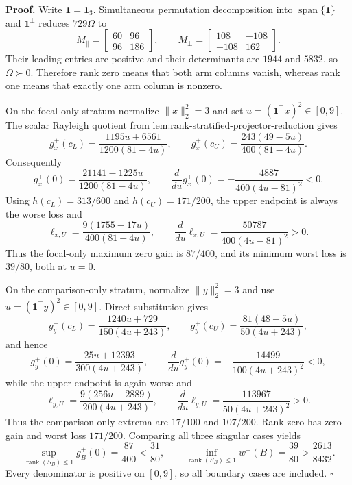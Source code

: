 \textbf{Proof.}
Write \(\mathbf1=\mathbf1_3\).  Simultaneous permutation decomposition into \(\operatorname{span}\{\mathbf1\}\) and \(\mathbf1^\perp\) reduces \(729\Omega\) to
\[
M_\parallel=\begin{bmatrix}60&96\\96&186\end{bmatrix},
\qquad M_\perp=\begin{bmatrix}108&-108\\-108&162\end{bmatrix}.
\]
Their leading entries are positive and their determinants are \(1944\) and \(5832\), so \(\Omega\succ0\).  Therefore rank zero means that both arm columns vanish, whereas rank one means that exactly one arm column is nonzero.

On the focal-only stratum normalize \(\lVert x\rVert_2^2=3\) and set \(u=(\mathbf1^{\top}x)^2\in[0,9]\).  The scalar Rayleigh quotient from lem:rank-stratified-projector-reduction gives
\[
g_x^+(c_L)=\frac{1195u+6561}{1200(81-4u)},
\qquad g_x^+(c_U)=\frac{243(49-5u)}{400(81-4u)}.
\]
Consequently
\[
g_x^+(0)=\frac{21141-1225u}{1200(81-4u)},
\qquad \frac{d}{du}g_x^+(0)=-\frac{4887}{400(4u-81)^2}<0.
\]
Using \(h(c_L)=313/600\) and \(h(c_U)=171/200\), the upper endpoint is always the worse loss and
\[
\ell_{x,U}=\frac{9(1755-17u)}{400(81-4u)},
\qquad \frac{d}{du}\ell_{x,U}=\frac{50787}{400(4u-81)^2}>0.
\]
Thus the focal-only maximum zero gain is \(87/400\), and its minimum worst loss is \(39/80\), both at \(u=0\).

On the comparison-only stratum, normalize \(\lVert y\rVert_2^2=3\) and use \(u=(\mathbf1^{\top}y)^2\in[0,9]\).  Direct substitution gives
\[
g_y^+(c_L)=\frac{1240u+729}{150(4u+243)},
\qquad g_y^+(c_U)=\frac{81(48-5u)}{50(4u+243)},
\]
and hence
\[
g_y^+(0)=\frac{25u+12393}{300(4u+243)},
\qquad \frac{d}{du}g_y^+(0)=-\frac{14499}{100(4u+243)^2}<0,
\]
while the upper endpoint is again worse and
\[
\ell_{y,U}=\frac{9(256u+2889)}{200(4u+243)},
\qquad \frac{d}{du}\ell_{y,U}=\frac{113967}{50(4u+243)^2}>0.
\]
Thus the comparison-only extrema are \(17/100\) and \(107/200\).  Rank zero has zero gain and worst loss \(171/200\).  Comparing all three singular cases yields
\[
\sup_{\operatorname{rank}(S_B)\le1}g_B^+(0)=\frac{87}{400}<\frac{31}{80},
\qquad
\inf_{\operatorname{rank}(S_B)\le1}w^+(B)=\frac{39}{80}>\frac{2613}{8432}.
\]
Every denominator is positive on \([0,9]\), so all boundary cases are included. \(\square\)
